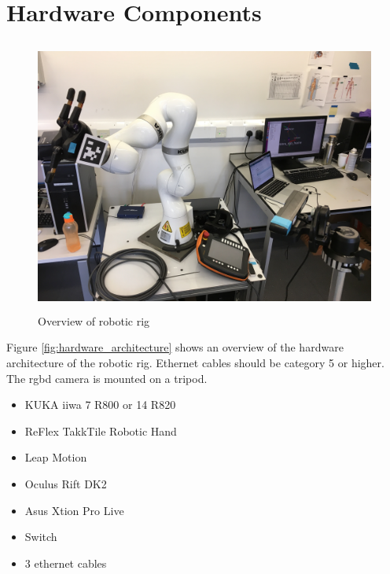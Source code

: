\documentclass[headsepline,footinclude=false,fontsize=11pt,paper=a4,listof=totoc,bibliography=totoc,BCOR=12mm,DIV=14]{scrbook}
\begin{document}
\section{Hardware Components}


\begin{figure}[h]
    \centering
    \includegraphics[height=9cm]{images/hardware_overview}
    \caption{Overview of robotic rig}
    \label{fig:hardware_overview}
\end{figure}

Figure \ref{fig:hardware_architecture} shows an overview of the hardware architecture of the robotic rig. Ethernet cables should be category 5 or higher. The \gls{rgbd} camera is mounted on a tripod. 

\newpage
\begin{itemize}
\item
  KUKA iiwa 7 R800 or 14 R820
\item
  ReFlex TakkTile Robotic Hand
\item
  Leap Motion
\item
  Oculus Rift DK2
\item
  Asus Xtion Pro Live
\item
  Switch
\item
  3 ethernet cables
\end{itemize}
\end{document}
